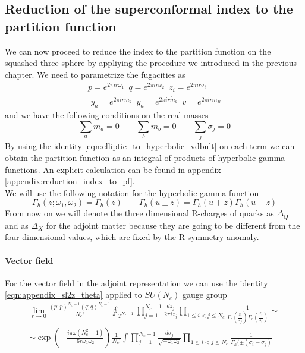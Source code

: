 \subsection{Reduction of the superconformal index to the partition function}
We can now proceed to reduce the index to the partition function on the squashed three sphere by appliying the procedure we introduced in the previous chapter. 
We need to parametrize the fugacities as
\begin{gather}
p = e^{ 2 \pi i r  \omega_1 } \, \, \,  q = e^{ 2 \pi i r \omega_2 } \,  \, \, z_i = e^{ 2 \pi i r \sigma_i } \\
\, \, y_a = e^{ 2 \pi i r m_a } \, \,  \,
y_a = e^{ 2 \pi i r  {\tilde m_a} } \, \, \,  v = e^{ 2 \pi i r m_B}
\label{eqn:fugacities_redefined_el}
\end{gather}
and we have the following conditions on the real masses
\begin{equation}
\sum_a m_a =0 \qquad \sum_b m_b = 0 \qquad \sum_j \sigma_j = 0
\end{equation}
By using the identity \eqref{eqn:elliptic_to_hyperbolic_vdbult} on each term we can obtain the partition function as an integral of products of hyperbolic gamma functions.
An explicit calculation can be found in appendix \ref{appendix:reduction_index_to_pf}.\\
We will use the following notation for the hyperbolic gamma function
\begin{equation}
\Gamma_h (z ; \omega_1 , \omega_2) = \Gamma_h(z) \qquad \Gamma_h ( u \pm z) = \Gamma_h( u + z) \Gamma_h( u - z)
\end{equation}
From now on we will denote the three dimensional R-charges of quarks as $\Delta_Q$ and as $\Delta_X$ for the adjoint matter because they are going to be different from the four dimensional values, which are fixed by the R-symmetry anomaly.

\paragraph{Vector field}

For the vector field in the adjoint representation we can use the identity \eqref{eqn:appendix_sl2z_theta} applied to $SU(N_c)$ gauge group
\begin{multline}
\lim_{r \rightarrow 0} \frac{ (p;p)^{N_c- 1}(q;q)^{N_c- 1} }{ N_c ! }
\oint_{T^{N_c -1}} \prod_{j=1}^{N_c -1 } \frac{ d z_j}{2 \pi i z_j} \prod_{1 \leq i<j \leq N_c } \frac{1}{\Gamma_e( \frac{z_i}{z_j} )\Gamma_e( \frac{z_j}{z_i} )} \sim
\\
\sim 
\exp \left(  
- \frac{ i \pi \omega (N_c^2 -1)}{6 r \omega_1 \omega_2}
\right)
 \frac{1}{N_c !} \int \prod_{j=1}^{N_c -1 } \frac{d \sigma_j}{\sqrt{- \omega_1 \omega_2} } \prod_{1 \leq i<j \leq N_c }\frac{1}{\Gamma_h( \pm (\sigma_i - \sigma_j) }
\end{multline}

